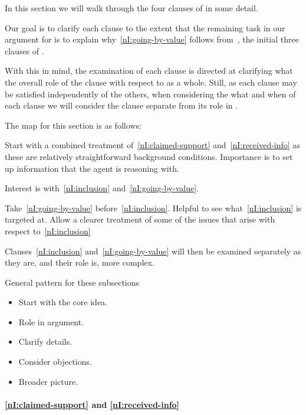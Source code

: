 \begin{note}[Overview]
  In this section we will walk through the four clauses of \nI{} in some detail.

  Our goal is to clarify each clause to the extent that the remaining task in our argument for \nI{} is to explain why~\ref{nI:going-by-value} follows from~\nIOTT{}, the initial three clauses of \nI{}.

  With this in mind, the examination of each clause is directed at clarifying what the overall role of the clause with respect to \nI{} as a whole.
  Still, as each clause may be satisfied independently of the others, when considering the what and when of each clause we will consider the clause separate from its role in \nI{}.

  The map for this section is as follows:

  Start with a combined treatment of~\ref{nI:claimed-support} and~\ref{nI:received-info} as these are relatively straightforward background conditions.
  Importance is to set up information that the agent is reasoning with.

  Interest is with~\ref{nI:inclusion} and~\ref{nI:going-by-value}.

  Take~\ref{nI:going-by-value} before~\ref{nI:inclusion}.
  Helpful to see what~\ref{nI:inclusion} is targeted at.
  Allow a clearer treatment of some of the issues that arise with respect to~\ref{nI:inclusion}

  \indent\indent Clauses~\ref{nI:inclusion} and~\ref{nI:going-by-value} will then be examined separately as they are, and their role is, more complex.

  \begin{center}
    General pattern for these subsections
    \begin{itemize}
    \item Start with the core idea.
    \item Role in argument.
    \item Clarify details.
    \item Consider objections.
    \item Broader picture.
    \end{itemize}
  \end{center}
\end{note}


\paragraph{\ref{nI:claimed-support} and \ref{nI:received-info}}

